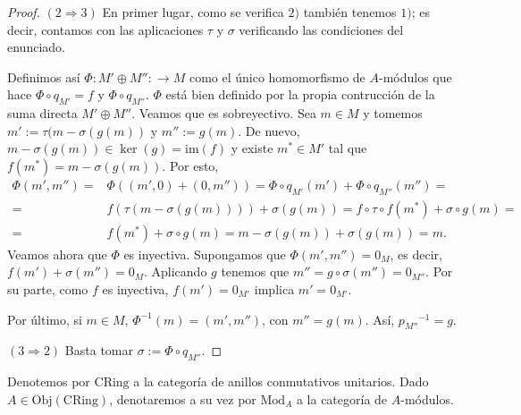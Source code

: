 \documentclass[../main.tex]{subfiles}
\begin{document}
\begin{proof}
	$(2\Rightarrow 3)$ En primer lugar, como se verifica $2)$ también tenemos $1)$; es decir, contamos con las aplicaciones $\tau$ y $\sigma$ verificando las condiciones del enunciado.
	
	Definimos así $\Phi:M'\oplus M'':\longrightarrow M$ como el único homomorfismo de $A$-módulos que hace $\Phi\circ q_{M'}=f$ y $\Phi\circ q_{M''}$. $\Phi$ está bien definido por la propia contrucción de la suma directa $M'\oplus M''$.
	Veamos que es sobreyectivo. Sea $m\in M$ y tomemos $m':=\tau(m-\sigma(g(m))$ y $m'':=g(m)$. De nuevo, $m-\sigma(g(m))\in\ker(g)=\text{im}(f)$ y existe $m^*\in M'$ tal que $f(m^*)=m-\sigma(g(m))$. Por esto,
	\begin{align*}
	\Phi(m',m'')=&\Phi((m',0)+(0,m''))=\Phi\circ q_{M'}(m')+\Phi\circ q_{M''}(m'')=\\
	=&f(\tau(m-\sigma(g(m))))+\sigma(g(m))=f\circ\tau\circ f(m^*)+\sigma\circ g(m)=\\
	=&f(m^*)+\sigma\circ g(m)=m-\sigma(g(m))+\sigma(g(m))=m.
	\end{align*}
	Veamos ahora que $\Phi$ es inyectiva. Supongamos que $\Phi(m',m'')=0_M$, es decir, $f(m')+\sigma(m'')=0_M$. Aplicando $g$ tenemos que $m''=g\circ\sigma(m'')=0_{M''}$. Por su parte, como $f$ es inyectiva, $f(m')=0_{M'}$ implica $m'=0_{M'}$.
	
	Por último, si $m\in M$, $\Phi^{-1}(m)=(m',m'')$, con $m''=g(m)$. Así, ${p_{M''}}^{-1}=g$.
	
	$(3\Rightarrow 2)$ Basta tomar $\sigma:= \Phi\circ q_{M''}$.
\end{proof}

Denotemos por $\text{CRing}$ a la categoría de anillos conmutativos unitarios. Dado $A\in\text{Obj}(\text{CRing})$, denotaremos a su vez por $\text{Mod}_A$ a la categoría de $A$-módulos.
\end{document}
